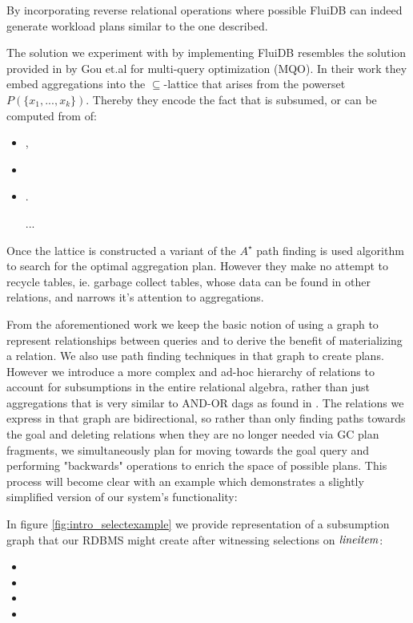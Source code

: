 By incorporating reverse relational operations where possible FluiDB
can indeed generate workload plans similar to the one described.

The solution we experiment with by implementing FluiDB resembles the
solution provided in \cite{gouSupSearchEfficient2006} by Gou et.al for
multi-query optimization (MQO). In their work they embed aggregations  into the \(\subseteq\)-lattice that arises from the powerset
\(P(\{x_1, ..., x_k\})\). Thereby they encode the fact that  is subsumed, or can be computed from of:
\begin{itemize}
\item {},
 \item {}
 \item {}.
 \item[...]
\end{itemize}

Once the lattice is constructed a variant of the \(A^{\star}\) path finding is
used algorithm to search for the optimal aggregation plan. However
they make no attempt to recycle tables, ie. garbage collect tables,
whose data can be found in other relations, and narrows it's attention
to aggregations.

From the aforementioned work we keep the basic notion of using a graph
to represent relationships between queries and to derive the benefit
of materializing a relation. We also use path finding techniques in
that graph to create plans. However we introduce a more complex and
ad-hoc hierarchy of relations to account for subsumptions in the entire
relational algebra, rather than just aggregations that is very
similar to AND-OR dags as found in
\cite{mistryMaterializedViewSelection2001}.  The relations we express
in that graph are bidirectional, so rather than only finding paths
towards the goal and deleting relations when they are no longer needed
via GC plan fragments, we simultaneously plan for moving towards the
goal query and performing "backwards" operations to enrich the space
of possible plans. This process will become clear with an example which demonstrates
a slightly simplified version of our system's functionality:

In figure \ref{fig:intro_selectexample} we provide representation of a
subsumption graph that our RDBMS might create after witnessing
selections on \(\mathit{lineitem}\):
\begin{itemize}
    \item {}
    \item {}
    \item {}
    \item {}
\end{itemize}

